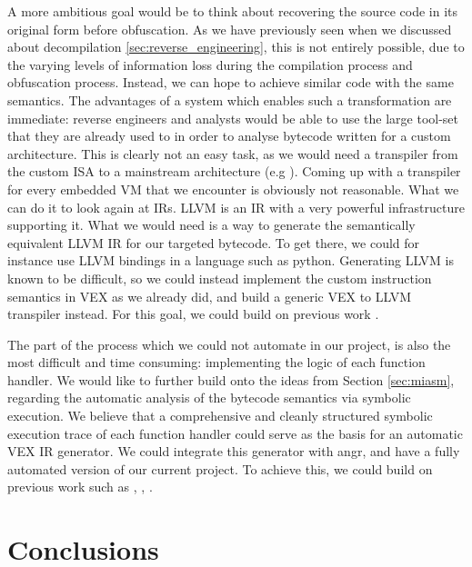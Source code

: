 A more ambitious goal would be to think about recovering the source code in its original form before obfuscation. As we have previously seen when we discussed about decompilation \ref{sec:reverse_engineering}, this is not entirely possible, due to the varying levels of information loss during the compilation process and obfuscation process. Instead, we can hope to achieve similar code with the same semantics. The advantages of a system which enables such a transformation are immediate: reverse engineers and analysts would be able to use the large tool-set that they are already used to in order to analyse bytecode written for a custom architecture. This is clearly not an easy task, as we would need a transpiler from the custom \gls{ISA} to a mainstream architecture (e.g ). Coming up with a transpiler for every embedded \gls{VM} that we encounter is obviously not reasonable. What we can do it to look again at \glspl{IR}. LLVM \cite{llvm} is an \gls{IR} with a very powerful infrastructure supporting it. What we would need is a way to generate the semantically equivalent LLVM \gls{IR} for our targeted bytecode. To get there, we could for instance use LLVM bindings in a language such as python. Generating LLVM is known to be difficult, so we could instead implement the custom instruction semantics in VEX as we already did, and build a generic VEX to LLVM transpiler instead. For this goal, we could build on previous work \cite{symbolic_deobf_2018}.

The part of the process which we could not automate in our project, is also the most difficult and time consuming: implementing the logic of each function handler. We would like to further build onto the ideas from Section \ref{sec:miasm}, regarding the automatic analysis of the bytecode semantics via symbolic execution. We believe that a comprehensive and cleanly structured symbolic execution trace of each function handler could serve as the basis for an automatic VEX \gls{IR} generator. We could integrate this generator with angr, and have a fully automated version of our current project. To achieve this, we could build on previous work such as \cite{dang2014practical}, \cite{liang2018}, \cite{symbolic_deobf_2018}.

\chapter{Conclusions}

